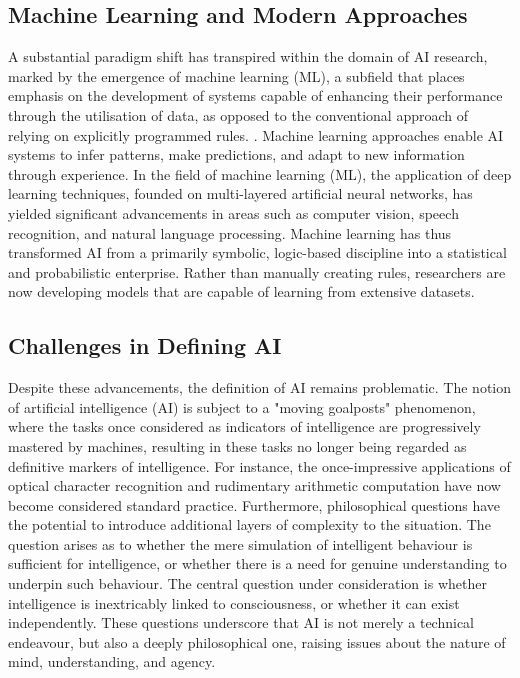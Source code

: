 \documentclass[runningheads]{llncs}
\begin{document}
\subsection{Machine Learning and Modern Approaches}
%
A substantial paradigm shift has transpired within the domain of AI research, marked by the emergence of machine learning (ML), a subfield that places emphasis on the development of systems capable of enhancing their performance through the utilisation of data, as opposed to the conventional approach of relying on explicitly programmed rules. \cite{goodfellow2016deep}. Machine learning approaches enable AI systems to infer patterns, make predictions, and adapt to new information through experience. In the field of machine learning (ML), the application of deep learning techniques, founded on multi-layered artificial neural networks, has yielded significant advancements in areas such as computer vision, speech recognition, and natural language processing. Machine learning has thus transformed AI from a primarily symbolic, logic-based discipline into a statistical and probabilistic enterprise. Rather than manually creating rules, researchers are now developing models that are capable of learning from extensive datasets.
%
%
\subsection{Challenges in Defining AI}
%
Despite these advancements, the definition of AI remains problematic. The notion of artificial intelligence (AI) is subject to a "moving goalposts" phenomenon, where the tasks once considered as indicators of intelligence are progressively mastered by machines, resulting in these tasks no longer being regarded as definitive markers of intelligence. For instance, the once-impressive applications of optical character recognition and rudimentary arithmetic computation have now become considered standard practice.
Furthermore, philosophical questions have the potential to introduce additional layers of complexity to the situation. The question arises as to whether the mere simulation of intelligent behaviour is sufficient for intelligence, or whether there is a need for genuine understanding to underpin such behaviour. The central question under consideration is whether intelligence is inextricably linked to consciousness, or whether it can exist independently. These questions underscore that AI is not merely a technical endeavour, but also a deeply philosophical one, raising issues about the nature of mind, understanding, and agency.
%
%
%
%
%
\end{document}
